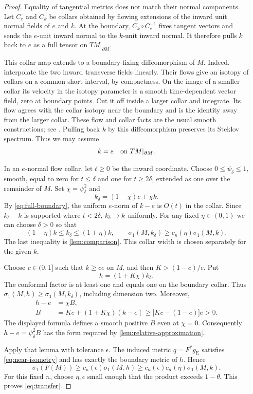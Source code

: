 \documentclass[11pt]{article}
\theoremstyle{remark}
\begin{document}
\begin{proof}
Equality of tangential metrics does not match their normal components.
Let $C_e$ and $C_k$ be collars obtained by flowing extensions of the
inward unit normal fields of $e$ and $k$. At the boundary,
$C_k\circ C_e^{-1}$ fixes tangent vectors and sends the $e$-unit inward
normal to the $k$-unit inward normal. It therefore pulls $k$ back to $e$
as a full tensor on $TM|_{\partial M}$.

This collar map extends to a boundary-fixing diffeomorphism of $M$.
Indeed, interpolate the two inward transverse fields linearly. Their
flows give an isotopy of collars on a common short interval, by
compactness. On the image of a smaller collar its velocity in the
isotopy parameter is a smooth time-dependent vector field, zero at
boundary points. Cut it off inside a larger collar and integrate.
Its flow agrees with the collar isotopy near the boundary and is
the identity away from the larger collar. These flow and collar facts
are the usual smooth constructions; see \cite[Section~6.2]{Hirsch}.
Pulling back $k$ by this diffeomorphism preserves its Steklov spectrum.
Thus we may assume
\begin{equation}\label{eq:full-boundary}
 k=e\quad\hbox{on }TM|_{\partial M}.
\end{equation}

In an $e$-normal flow collar, let $t\geq0$ be the inward coordinate.
Choose $0\leq\psi_\delta\leq1$, smooth, equal to zero for $t\leq\delta$
and one for $t\geq2\delta$, extended as one over the remainder of $M$.
Set $\chi=\psi_\delta^2$ and
\[
 k_\delta=(1-\chi)e+\chi k.
\]
By \eqref{eq:full-boundary}, the uniform $e$-norm of $k-e$ is $O(t)$
in the collar. Since $k_\delta-k$ is supported where $t<2\delta$,
$k_\delta\to k$ uniformly. For any fixed $\eta\in(0,1)$ we can choose
$\delta>0$ so that
\[
 (1-\eta)k\leq k_\delta\leq(1+\eta)k,
 \qquad
 \sigma_1(M,k_\delta)\geq c_n(\eta)\sigma_1(M,k).
\]
The last inequality is \cref{lem:comparison}. This collar width is
chosen separately for the given $k$.

Choose $c\in(0,1]$ such that $k\geq ce$ on $M$, and then
$K>(1-c)/c$. Put
\[
 h=(1+K\chi)k_\delta.
\]
The conformal factor is at least one and equals one on the boundary
collar. Thus $\sigma_1(M,h)\geq\sigma_1(M,k_\delta)$, including
dimension two. Moreover,
\begin{align*}
 h-e&=\chi B,\\
 B&=Ke+(1+K\chi)(k-e)
    \geq\bigl[Kc-(1-c)\bigr]e>0.
\end{align*}
The displayed formula defines a smooth positive $B$ even at $\chi=0$.
Consequently $h-e=\psi_\delta^2 B$ has the form required by
\cref{lem:relative-approximation}.

Apply that lemma with tolerance $\epsilon$. The induced metric
$q=F^*g_{\mathrm E}$ satisfies \eqref{eq:near-isometry} and has exactly
the boundary metric of $h$. Hence
\[
 \sigma_1(F(M))
 \geq c_n(\epsilon)\sigma_1(M,h)
 \geq c_n(\epsilon)c_n(\eta)\sigma_1(M,k).
\]
For this fixed $n$, choose $\eta,\epsilon$ small enough that the product
exceeds $1-\theta$. This proves \eqref{eq:transfer}.
\end{proof}
\end{document}

